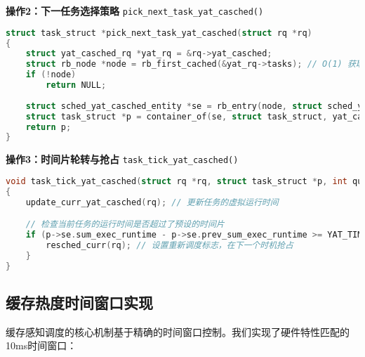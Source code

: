 \textbf{操作2：下一任务选择策略} \hfill \texttt{pick\_next\_task\_yat\_casched()}
\begin{tcolorbox} [enhanced, title=\textbf{任务选择策略实现}]
\begin{lstlisting}[language=C, basicstyle=\footnotesize\fontfamily{zi4}\selectfont, showstringspaces=false]
struct task_struct *pick_next_task_yat_casched(struct rq *rq)
{
    struct yat_casched_rq *yat_rq = &rq->yat_casched;
    struct rb_node *node = rb_first_cached(&yat_rq->tasks); // O(1) 获取最左节点
    if (!node)
        return NULL;
    
    struct sched_yat_casched_entity *se = rb_entry(node, struct sched_yat_casched_entity, rb_node);
    struct task_struct *p = container_of(se, struct task_struct, yat_casched);
    return p;
}
\end{lstlisting}
\end{tcolorbox}

\textbf{操作3：时间片轮转与抢占} \hfill \texttt{task\_tick\_yat\_casched()}
\begin{tcolorbox} [enhanced, title=\textbf{时间片与抢占处理}]
\begin{lstlisting}[language=C, basicstyle=\footnotesize\fontfamily{zi4}\selectfont, showstringspaces=false]
void task_tick_yat_casched(struct rq *rq, struct task_struct *p, int queued)
{
    update_curr_yat_casched(rq); // 更新任务的虚拟运行时间

    // 检查当前任务的运行时间是否超过了预设的时间片
    if (p->se.sum_exec_runtime - p->se.prev_sum_exec_runtime >= YAT_TIME_SLICE) {
        resched_curr(rq); // 设置重新调度标志，在下一个时机抢占
    }
}
\end{lstlisting}
\end{tcolorbox}

\subsection{缓存热度时间窗口实现}

缓存感知调度的核心机制基于精确的时间窗口控制。我们实现了硬件特性匹配的10ms时间窗口：

